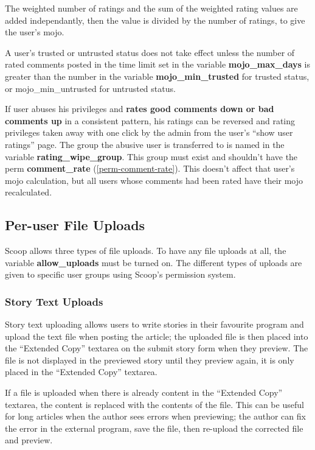 The weighted number of ratings and the sum of the weighted rating values are added independantly, then the value is divided by the number of ratings, to give the user's mojo.

A user's trusted or untrusted status does not take effect unless the number of rated comments posted in the time limit set in the variable {\bf mojo\_max\_days} is greater than the number in the variable {\bf mojo\_min\_trusted} for trusted status, or {mojo\_min\_untrusted} for untrusted status.

If user abuses his privileges and {\bf rates good comments down or bad comments up} in a consistent pattern, his ratings can be reversed and rating privileges taken away with one click by the admin from the user's ``show user ratings'' page.  The group the abusive user is transferred to is named in the variable {\bf rating\_wipe\_group}.  This group must exist and shouldn't have the perm {\bf comment\_rate} (\ref{perm-comment-rate}).  This doesn't affect that user's mojo calculation, but all users whose comments had been rated have their mojo recalculated.

\subsection{Per-user File Uploads}
\label{features-file-uploads}

Scoop allows three types of file uploads.  To have any file uploads at all, the variable {\bf allow\_uploads} must be turned on. The different types of uploads are given to specific user groups using Scoop's permission system.

\subsubsection{Story Text Uploads}

Story text uploading allows users to write stories in their favourite program and upload the text file when posting the article; the uploaded file is then placed into the ``Extended Copy'' textarea on the submit story form when they preview. The file is not displayed in the previewed story until they preview again, it is only placed in the ``Extended Copy'' textarea.

If a file is uploaded when there is already content in the ``Extended Copy'' textarea, the content is replaced with the contents of the file. This can be useful for long articles when the author sees errors when previewing; the author can fix the error in the external program, save the file, then re-upload the corrected file and preview.

